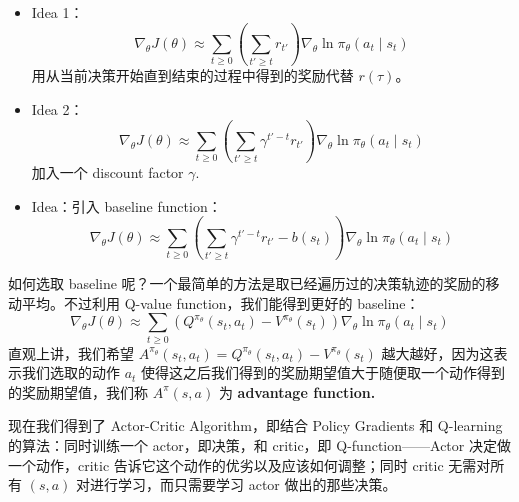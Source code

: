 \begin{itemize}
    \item Idea 1：
    \[
    \nabla_\theta J(\theta)\approx \sum_{t\geqslant 0}\left(\sum_{t'\geqslant t} r_{t'}\right)\nabla_\theta\ln\pi_\theta(a_t\mid s_t)
    \]
    用从当前决策开始直到结束的过程中得到的奖励代替 $r(\tau)$。

    \item Idea 2：
    \[
    \nabla_\theta J(\theta)\approx \sum_{t\geqslant 0}\left(\sum_{t'\geqslant t} \gamma^{t'-t}r_{t'}\right)\nabla_\theta\ln\pi_\theta(a_t\mid s_t)
    \]
    加入一个 discount factor $\gamma$.

    \item Idea：引入 baseline function：
    \[
    \nabla_\theta J(\theta)\approx \sum_{t\geqslant 0}\left(\sum_{t'\geqslant t} \gamma^{t'-t}r_{t'}-b(s_t)\right)\nabla_\theta\ln\pi_\theta(a_t\mid s_t)
    \]

\end{itemize}
如何选取 baseline 呢？一个最简单的方法是取已经遍历过的决策轨迹的奖励的移动平均。不过利用 Q-value function，我们能得到更好的 baseline：
\[
\nabla_\theta J(\theta)\approx \sum_{t\geqslant 0}\left(Q^{\pi_\theta}(s_t,a_t)-V^{\pi_\theta}(s_t)\right)\nabla_\theta\ln\pi_\theta(a_t\mid s_t)
\]
直观上讲，我们希望 $A^{\pi_\theta}(s_t,a_t)=Q^{\pi_\theta}(s_t,a_t)-V^{\pi_\theta}(s_t)$ 越大越好，因为这表示我们选取的动作 $a_t$ 使得这之后我们得到的奖励期望值大于随便取一个动作得到的奖励期望值，我们称 $A^\pi(s,a)$ 为 \textbf{advantage function.}

现在我们得到了 Actor-Critic Algorithm，即结合 Policy Gradients 和 Q-learning 的算法：同时训练一个 actor，即决策，和 critic，即 Q-function——Actor 决定做一个动作，critic 告诉它这个动作的优劣以及应该如何调整；同时 critic 无需对所有 $(s,a)$ 对进行学习，而只需要学习 actor 做出的那些决策。
